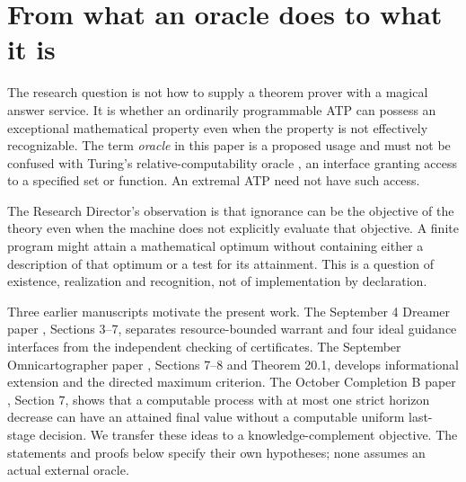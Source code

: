 \documentclass[11pt]{article}
\begin{document}
\section{From what an oracle does to what it is}
The research question is not how to supply a theorem prover with a magical answer service. It is whether an ordinarily programmable ATP can possess an exceptional mathematical property even when the property is not effectively recognizable. The term \emph{oracle} in this paper is a proposed usage and must not be confused with Turing's relative-computability oracle \cite{turing}, an interface granting access to a specified set or function. An extremal ATP need not have such access.

The Research Director's observation is that ignorance can be the objective of the theory even when the machine does not explicitly evaluate that objective. A finite program might attain a mathematical optimum without containing either a description of that optimum or a test for its attainment. This is a question of existence, realization and recognition, not of implementation by declaration.

Three earlier manuscripts motivate the present work. The September 4 Dreamer paper \cite{dreamer}, Sections 3--7, separates resource-bounded warrant and four ideal guidance interfaces from the independent checking of certificates. The September Omnicartographer paper \cite{cart}, Sections 7--8 and Theorem 20.1, develops informational extension and the directed maximum criterion. The October Completion B paper \cite{boundary}, Section 7, shows that a computable process with at most one strict horizon decrease can have an attained final value without a computable uniform last-stage decision. We transfer these ideas to a knowledge-complement objective. The statements and proofs below specify their own hypotheses; none assumes an actual external oracle.
\end{document}
